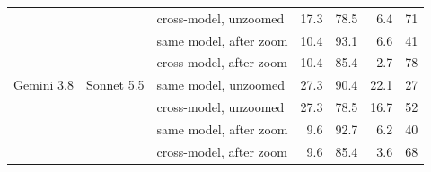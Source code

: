 \begin{table}[tp]
\begin{tabular}{@{}lllrrrr@{}}
 &  & cross-model, unzoomed & 17.3 & 78.5 & 6.4 & 71 \\
 &  & same model, after zoom & 10.4 & 93.1 & 6.6 & 41 \\
 &  & cross-model, after zoom & 10.4 & 85.4 & 2.7 & 78 \\
\midrule
Gemini 3.8 & Sonnet 5.5 & same model, unzoomed & 27.3 & 90.4 & 22.1 & 27 \\
 &  & cross-model, unzoomed & 27.3 & 78.5 & 16.7 & 52 \\
 &  & same model, after zoom & 9.6 & 92.7 & 6.2 & 40 \\
 &  & cross-model, after zoom & 9.6 & 85.4 & 3.6 & 68 \\
\bottomrule\end{tabular}\end{table}
